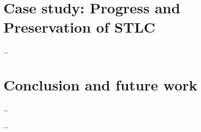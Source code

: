 \documentclass[english, mgr]{iithesis}
\begin{document}
\chapter{Case study: Progress and Preservation of STLC}

\dots

\chapter{Conclusion and future work}

\dots


\begin{thebibliography}{1}
 \ldots
\end{thebibliography}
\end{document}
